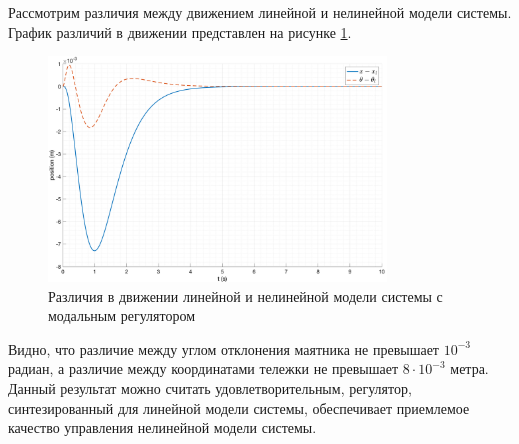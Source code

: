 Рассмотрим различия между движением линейной и нелинейной модели системы. График различий в движении
представлен на рисунке \ref{fig:modal_control_cmp}.
\begin{figure}[ht!]
    \centering
    \includegraphics[width=0.8\textwidth]{media/plots/modal_control/modal_control_cmp_0.png}
    \caption{Различия в движении линейной и нелинейной модели системы с модальным регулятором}
    \label{fig:modal_control_cmp}
\end{figure}
Видно, что различие между углом отклонения маятника не превышает $10^{-3}$ радиан, а различие между
координатами тележки не превышает $8\cdot10^{-3}$ метра. Данный результат можно считать удовлетворительным, 
регулятор, синтезированный для линейной модели системы, обеспечивает приемлемое качество управления 
нелинейной модели системы. 

\FloatBarrier
